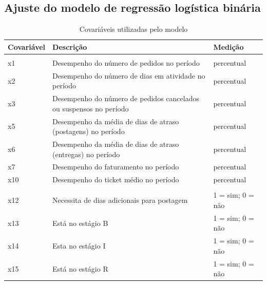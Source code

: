 \documentclass[twocolumn]{rbef}
\newcommand{\1}{\mathbbm{1}}
\begin{document}
\hypertarget{ajuste-do-modelo-de-regressuxe3o-loguxedstica-binuxe1ria}{%
\subsection{Ajuste do modelo de regressão logística binária}\label{ajuste-do-modelo-de-regressuxe3o-loguxedstica-binuxe1ria}}

\begin{table}

\caption{\label{tab:covars}Covariáveis utilizadas pelo modelo}
\centering
\fontsize{9}{11}\selectfont
\begin{tabular}[t]{lll}
\toprule
Covariável & Descrição & Medição\\
\midrule
\addlinespace[0.3em]
\multicolumn{3}{l}{\textbf{Métricas de desempenho}}\\
\hspace{1em}x1 & Desempenho do número de pedidos no período & percentual\\
\hspace{1em}x2 & Desempenho do número de dias em atividade no período & percentual\\
\hspace{1em}x3 & Desempenho do número de pedidos cancelados ou suspensos no período & percentual\\
\hspace{1em}x5 & Desempenho da média de dias de atraso (postagens) no período & percentual\\
\hspace{1em}x6 & Desempenho da média de dias de atraso (entregas) no período & percentual\\
\hspace{1em}x7 & Desempenho do faturamento no período & percentual\\
\hspace{1em}x10 & Desempenho do ticket médio no período & percentual\\
\addlinespace[0.3em]
\multicolumn{3}{l}{\textbf{Qualitativas}}\\
\hspace{1em}x12 & Necessita de dias adicionais para postagem & 1 = sim; 0 = não\\
\hspace{1em}x13 & Está no estágio B & 1 = sim; 0 = não\\
\hspace{1em}x14 & Esta no estágio I & 1 = sim; 0 = não\\
\hspace{1em}x15 & Está no estágio R & 1 = sim; 0 = não\\

\end{tabular}
\end{table}
\end{document}
